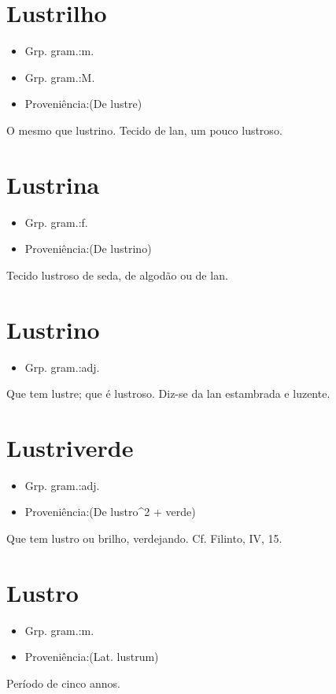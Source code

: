 \section{Lustrilho}
\begin{itemize}
\item {Grp. gram.:m.}
\end{itemize}
\begin{itemize}
\item {Grp. gram.:M.}
\end{itemize}
\begin{itemize}
\item {Proveniência:(De \textunderscore lustre\textunderscore )}
\end{itemize}
O mesmo que \textunderscore lustrino\textunderscore .
Tecido de lan, um pouco lustroso.
\section{Lustrina}
\begin{itemize}
\item {Grp. gram.:f.}
\end{itemize}
\begin{itemize}
\item {Proveniência:(De \textunderscore lustrino\textunderscore )}
\end{itemize}
Tecido lustroso de seda, de algodão ou de lan.
\section{Lustrino}
\begin{itemize}
\item {Grp. gram.:adj.}
\end{itemize}
Que tem lustre; que é lustroso.
Diz-se da lan estambrada e luzente.
\section{Lustriverde}
\begin{itemize}
\item {Grp. gram.:adj.}
\end{itemize}
\begin{itemize}
\item {Proveniência:(De \textunderscore lustro\textunderscore ^2 + \textunderscore verde\textunderscore )}
\end{itemize}
Que tem lustro ou brilho, verdejando. Cf. Filinto, IV, 15.
\section{Lustro}
\begin{itemize}
\item {Grp. gram.:m.}
\end{itemize}
\begin{itemize}
\item {Proveniência:(Lat. \textunderscore lustrum\textunderscore )}
\end{itemize}
Período de cinco annos.
